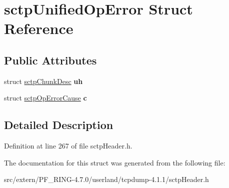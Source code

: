 \hypertarget{structsctp_unified_op_error}{
\section{sctpUnifiedOpError Struct Reference}
\label{structsctp_unified_op_error}
}
\subsection*{Public Attributes}
\begin{DoxyCompactItemize}
\item 
\hypertarget{structsctp_unified_op_error_aece16fb6ad377155ab5d7c0819588b56}{
struct \hyperlink{structsctp_chunk_desc}{sctpChunkDesc} {\bfseries uh}}
\label{structsctp_unified_op_error_aece16fb6ad377155ab5d7c0819588b56}

\item 
\hypertarget{structsctp_unified_op_error_a47cb40fa639b289de0ebc7f9f0f70df7}{
struct \hyperlink{structsctp_op_error_cause}{sctpOpErrorCause} {\bfseries c}}
\label{structsctp_unified_op_error_a47cb40fa639b289de0ebc7f9f0f70df7}

\end{DoxyCompactItemize}


\subsection{Detailed Description}


Definition at line 267 of file sctpHeader.h.



The documentation for this struct was generated from the following file:\begin{DoxyCompactItemize}
\item 
src/extern/PF\_\-RING-\/4.7.0/userland/tcpdump-\/4.1.1/sctpHeader.h\end{DoxyCompactItemize}
